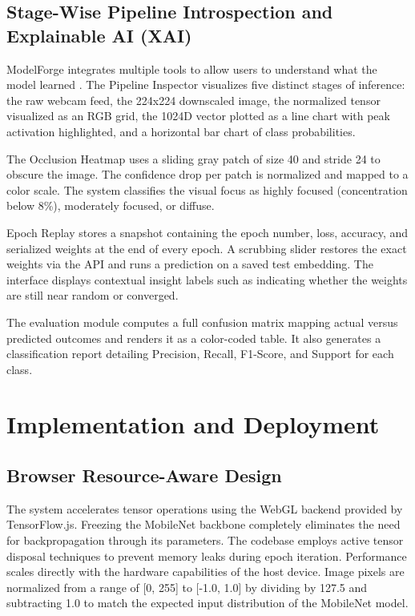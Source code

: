 \documentclass[conference]{IEEEtran}
\begin{document}
\subsection{Stage-Wise Pipeline Introspection and Explainable AI (XAI)}
ModelForge integrates multiple tools to allow users to understand what the model learned \cite{Zeiler2014}. The Pipeline Inspector visualizes five distinct stages of inference: the raw webcam feed, the 224x224 downscaled image, the normalized tensor visualized as an RGB grid, the 1024D vector plotted as a line chart with peak activation highlighted, and a horizontal bar chart of class probabilities.

The Occlusion Heatmap uses a sliding gray patch of size 40 and stride 24 to obscure the image. The confidence drop per patch is normalized and mapped to a color scale. The system classifies the visual focus as highly focused (concentration below 8\%), moderately focused, or diffuse. 

Epoch Replay stores a snapshot containing the epoch number, loss, accuracy, and serialized weights at the end of every epoch. A scrubbing slider restores the exact weights via the API and runs a prediction on a saved test embedding. The interface displays contextual insight labels such as indicating whether the weights are still near random or converged. 

The evaluation module computes a full confusion matrix mapping actual versus predicted outcomes and renders it as a color-coded table. It also generates a classification report detailing Precision, Recall, F1-Score, and Support for each class.

\section{Implementation and Deployment}

\subsection{Browser Resource-Aware Design}
The system accelerates tensor operations using the WebGL backend provided by TensorFlow.js. Freezing the MobileNet backbone completely eliminates the need for backpropagation through its parameters. The codebase employs active tensor disposal techniques to prevent memory leaks during epoch iteration. Performance scales directly with the hardware capabilities of the host device. Image pixels are normalized from a range of [0, 255] to [-1.0, 1.0] by dividing by 127.5 and subtracting 1.0 to match the expected input distribution of the MobileNet model.
\end{document}

